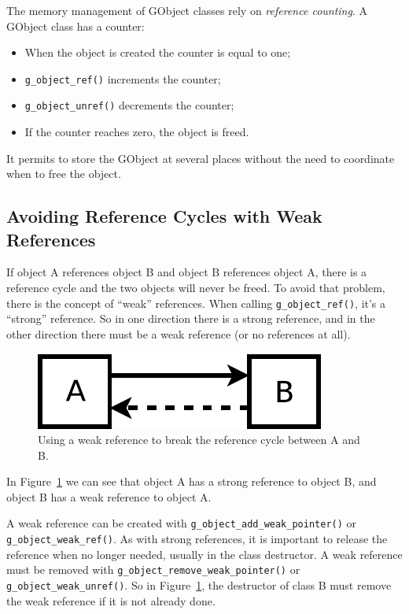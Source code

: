 The memory management of GObject classes rely on \emph{reference counting}. A GObject class has a counter:
\begin{itemize}
  \item When the object is created the counter is equal to one;
  \item \lstinline{g_object_ref()} increments the counter;
  \item \lstinline{g_object_unref()} decrements the counter;
  \item If the counter reaches zero, the object is freed.
\end{itemize}

It permits to store the GObject at several places without the need to coordinate when to free the object.

\subsection{Avoiding Reference Cycles with Weak References}

If object A references object B and object B references object A, there is a reference cycle and the two objects will never be freed. To avoid that problem, there is the concept of ``weak'' references. When calling \lstinline{g_object_ref()}, it's a ``strong'' reference. So in one direction there is a strong reference, and in the other direction there must be a weak reference (or no references at all).

\begin{figure}
  \begin{center}
    \includegraphics[scale=0.75]{images/weak-ref.pdf}
    \caption{Using a weak reference to break the reference cycle between A and B.}
    \label{oop-gobject-weak-ref-schema}
  \end{center}
\end{figure}

In Figure~\ref{oop-gobject-weak-ref-schema} we can see that object A has a strong reference to object B, and object B has a weak reference to object A.

A weak reference can be created with \lstinline{g_object_add_weak_pointer()} or \lstinline{g_object_weak_ref()}. As with strong references, it is important to release the reference when no longer needed, usually in the class destructor. A weak reference must be removed with \lstinline{g_object_remove_weak_pointer()} or \lstinline{g_object_weak_unref()}. So in Figure~\ref{oop-gobject-weak-ref-schema}, the destructor of class B must remove the weak reference if it is not already done.

